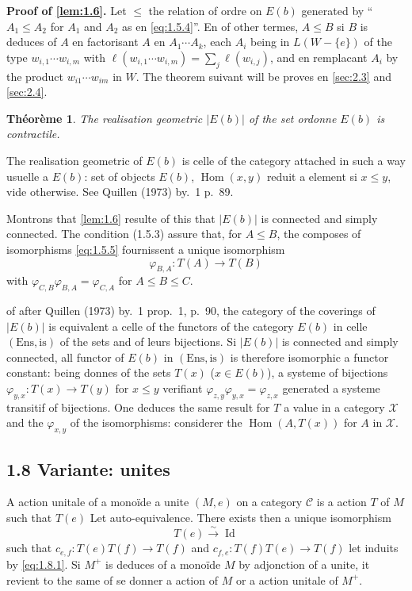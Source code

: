 \documentclass[11pt,a4paper]{article}
\theoremstyle{plain}
\newtheorem{theorem}{Th\'eor\`eme}[section]
\theoremstyle{definition}
\DeclareMathOperator{\Hom}{Hom}
\newcommand{\cC}{\mathscr{C}}
\newcommand{\cX}{\mathscr{X}}
\begin{document}
\noindent\textbf{Proof of \ref{lem:1.6}.} Let $\leq$ the relation of ordre on $E(b)$ generated by ``$A_1 \leq A_2$ for $A_1$ and $A_2$ as en \eqref{eq:1.5.4}''. En of other termes, $A \leq B$ si $B$ is deduces of $A$ en factorisant $A$ en $A_1 \cdots A_k$, each $A_i$ being in $L(W - \{e\})$ of the type $w_{i,1} \cdots w_{i,m}$ with $\ell(w_{i,1} \cdots w_{i,m}) = \sum_j \ell(w_{i,j})$, and en remplacant $A_i$ by the product $w_{i1} \cdots w_{im}$ in $W$. The theorem suivant will be proves en \ref{sec:2.3} and \ref{sec:2.4}.

\begin{theorem}\label{thm:1.7}
The realisation geometric $|E(b)|$ of the set ordonne $E(b)$ is contractile.
\end{theorem}

The realisation geometric of $E(b)$ is celle of the category attached in such a way usuelle a $E(b)$: set of objects $E(b)$, $\Hom(x,y)$ reduit a element si $x \leq y$, vide otherwise. See Quillen (1973) by.~1 p.~89.

Montrons that \ref{lem:1.6} resulte of this that $|E(b)|$ is connected and simply connected. The condition (1.5.3) assure that, for $A \leq B$, the composes of isomorphisms \eqref{eq:1.5.5} fournissent a unique isomorphism
\[
\varphi_{B,A} : T(A) \to T(B)
\]
with $\varphi_{C,B} \varphi_{B,A} = \varphi_{C,A}$ for $A \leq B \leq C$.

of after Quillen (1973) by.~1 prop.~1, p.~90, the category of the coverings of $|E(b)|$ is equivalent a celle of the functors of the category $E(b)$ in celle $(\text{Ens}, \text{is})$ of the sets and of leurs bijections. Si $|E(b)|$ is connected and simply connected, all functor of $E(b)$ in $(\text{Ens}, \text{is})$ is therefore isomorphic a functor constant: being donnes of the sets $T(x)$ ($x \in E(b)$), a systeme of bijections $\varphi_{y,x} : T(x) \to T(y)$ for $x \leq y$ verifiant $\varphi_{z,y} \varphi_{y,x} = \varphi_{z,x}$ generated a systeme transitif of bijections. One deduces the same result for $T$ a value in a category $\cX$ and the $\varphi_{x,y}$ of the isomorphisms: considerer the $\Hom(A, T(x))$ for $A$ in $\cX$.

\subsection*{1.8 Variante: unites}

A action unitale of a mono\"ide a unite $(M, e)$ on a category $\cC$ is a action $T$ of $M$ such that $T(e)$ Let auto-equivalence. There exists then a unique isomorphism
\begin{equation}\label{eq:1.8.1}
T(e) \xrightarrow{\;\sim\;} \operatorname{Id}
\tag{1.8.1}
\end{equation}
such that $c_{e,f} : T(e)T(f) \to T(f)$ and $c_{f,e} : T(f)T(e) \to T(f)$ let induits by \eqref{eq:1.8.1}. Si $M^+$ is deduces of a mono\"ide $M$ by adjonction of a unite, it revient to the same of se donner a action of $M$ or a action unitale of $M^+$.
\end{document}

